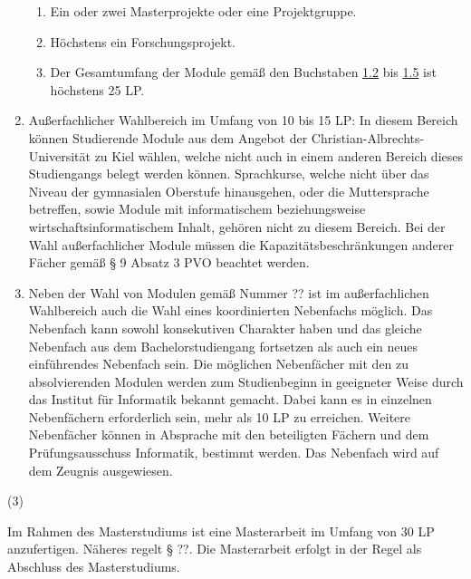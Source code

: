 \documentclass{article}\usepackage{helvet}\renewcommand{\familydefault}{\sfdefault}\usepackage[letterpaper,top=2cm,bottom=2cm,left=3cm,right=3cm,marginparwidth=1.75cm]{geometry}\usepackage[colorlinks=true,allcolors=red]{hyperref}\usepackage{enumitem}\usepackage{tabularx}\usepackage[T1]{fontenc}\setlist[enumerate,1]{label=\arabic*., left=0pt}\setlist[enumerate,2]{label=\alph*., left=0.5em}\setlist[enumerate,3]{label=\alph*\alph*., left=1em}\setlist[enumerate,4]{label=-, left=1.5em}\setlist{nosep}\setlength{\parindent}{0pt}
\begin{document}
\begin{minipage}[t]
\begin{enumerate}
{\begin{enumerate}
				\item{Ein oder zwei Masterprojekte oder eine Projektgruppe.}
				\item{Höchstens ein Forschungsprojekt.}
				\item{Der Gesamtumfang der Module gemäß den Buchstaben \hyperlink{numb}{1.2} bis \hyperlink{nume}{1.5} ist höchstens 25 LP.}
			\end{enumerate}
}
			\item{Außerfachlicher Wahlbereich im Umfang von 10 bis 15 LP: In diesem Bereich können Studierende Module aus dem Angebot der Christian-Albrechts-Universität zu Kiel wählen, welche nicht auch in einem anderen Bereich dieses Studiengangs belegt werden können. Sprachkurse, welche nicht über das Niveau der gymnasialen Oberstufe hinausgehen, oder die Muttersprache betreffen, sowie Module mit informatischem beziehungsweise wirtschaftsinformatischem Inhalt, gehören nicht zu diesem Bereich. Bei der Wahl außerfachlicher Module müssen die Kapazitätsbeschränkungen anderer Fächer gemäß § 9 Absatz 3 PVO beachtet werden.}
			\item{Neben der Wahl von Modulen gemäß Nummer {\Large ??} ist im außerfachlichen Wahlbereich auch die Wahl eines koordinierten Nebenfachs möglich. Das Nebenfach kann sowohl konsekutiven Charakter haben und das gleiche Nebenfach aus dem Bachelorstudiengang fortsetzen als auch ein neues einführendes Nebenfach sein. Die möglichen Nebenfächer mit den zu absolvierenden Modulen werden zum Studienbeginn in geeigneter Weise durch das Institut für Informatik bekannt gemacht. Dabei kann es in einzelnen Nebenfächern erforderlich sein, mehr als 10 LP zu erreichen. Weitere Nebenfächer können in Absprache mit den beteiligten Fächern und dem Prüfungsausschuss Informatik, bestimmt werden. Das Nebenfach wird auf dem Zeugnis ausgewiesen.}
		\end{enumerate}

	\end{minipage}

\medski

	\begin{minipage}[t]
		{2em}
		(3)
	\end{minipage}
\hspace{0.5em}
	\begin{minipage}[t]
		{\dimexpr\linewidth-2em-0.5em\relax}
		Im Rahmen des Masterstudiums ist eine Masterarbeit im Umfang von 30 LP anzufertigen. Näheres regelt § {\Large ??}. Die Masterarbeit erfolgt in der Regel als Abschluss des Masterstudiums.
	\end{minipage}
\end{document}
